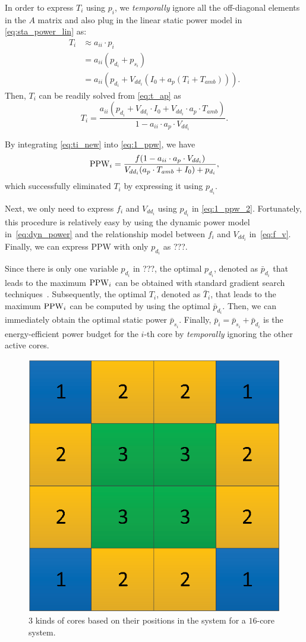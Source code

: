 In order to express $T_i$ using $p_i$, we \emph{temporally} ignore all
the off-diagonal elements in the $A$ matrix and also plug in the
linear static power model in \eqref{eq:sta_power_lin} as:
\begin{equation}\label{eq:t_ap}
\begin{split}
T_{i}&\approx a_{ii} \cdot p_{i}\\
&=a_{ii}(p_{d_i}+p_{s_i})\\
&=a_{ii}(p_{d_i}+V_{dd_i}(I_{0}+a_{p}(T_{i}+T_{amb}))).
\end{split}
\end{equation}
Then, $T_i$ can be readily solved from \eqref{eq:t_ap} as
\begin{equation}\label{eq:ti_new}
T_{i}=\frac{a_{ii}(p_{d_i}+V_{dd_i}\cdot I_{0}+V_{dd_i}\cdot a_{p}\cdot T_{amb})}{1-a_{ii} \cdot a_{p} \cdot V_{dd_i}}.
\end{equation}

By integrating \eqref{eq:ti_new} into \eqref{eq:1_ppw}, we have
\begin{equation}\label{eq:1_ppw_2}
\ppw_i = \frac{f(1-a_{ii} \cdot a_{p} \cdot V_{dd_i})}{V_{dd_i}(a_{p}\cdot T_{amb}+I_{0})+p_{d_i}},
\end{equation}
which successfully eliminated $T_i$ by expressing it using $p_{d_i}$.

Next, we only need to express $f_i$ and $V_{dd_i}$ using $p_{d_i}$ in
\eqref{eq:1_ppw_2}. Fortunately, this procedure is relatively easy by
using the dynamic power model in~\eqref{eq:dyn_power} and the
relationship model between $f_i$ and $V_{dd_i}$
in~\eqref{eq:f_v}. Finally, we can express PPW with only $p_{d_i}$ as ???.

Since there is only one variable $p_{d_i}$ in ???,  the optimal $p_{d_i}$,
denoted as $\bar{p}_{d_i}$ that leads to
the maximum $\operatorname{PPW}_i$ can be obtained with standard gradient search
techniques~\cite{Boyd:Convex_BOOK'06}. Subsequently, the optimal
$T_i$, denoted as $\bar{T}_i$, that leads to the maximum $\operatorname{PPW}_i$ can
be computed by using the optimal $\bar{p}_{d_i}$. Then, we can immediately
obtain the optimal static power $\bar{p}_{s_i}$. Finally, $\bar{p}_i =
\bar{p}_{s_i}+\bar{p}_{d_i}$ is the energy-efficient power
  budget for the $i$-th core by \emph{temporally} ignoring the other active cores. 

\begin{figure}
\centering
\includegraphics[width=0.46\linewidth]{fig/unique_position.eps}
\caption{$3$ kinds of cores based on their positions in the system for a $16$-core system.}
\label{fig:unique_position}
\end{figure}


